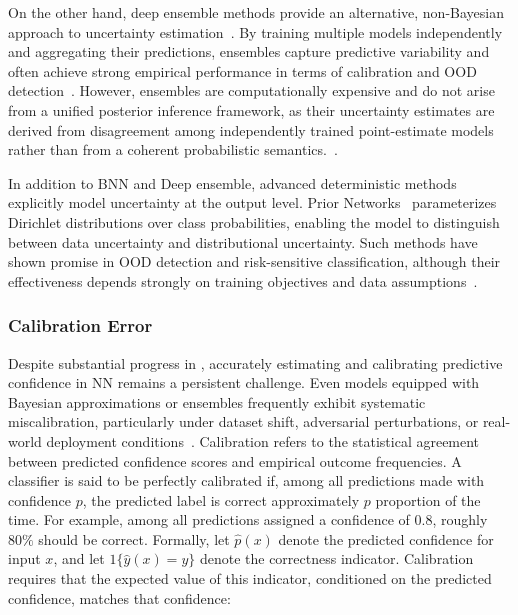 On the other hand, deep ensemble methods provide an alternative, non-Bayesian approach to uncertainty estimation~\cite{lakshminarayanan2017simplescalablepredictiveuncertainty}. 
By training multiple models independently and aggregating their predictions, ensembles capture predictive variability and often achieve strong empirical performance in terms of calibration and \ac{OOD} detection~\cite{ovadia2019trustmodelsuncertaintyevaluating}. However, ensembles are computationally expensive and do not arise from a unified posterior inference framework, as their uncertainty estimates are derived from disagreement among independently trained point-estimate models rather than from a coherent probabilistic semantics.~\cite{Gal2016Uncertainty}.

In addition to \ac{BNN} and Deep ensemble, advanced deterministic methods explicitly model uncertainty at the output level. Prior Networks~\cite{malinin2018predictiveuncertaintyestimationprior} parameterizes Dirichlet distributions over class probabilities, enabling the model to distinguish between data uncertainty and distributional uncertainty. Such methods have shown promise in \ac{OOD} detection and risk-sensitive classification, although their effectiveness depends strongly on training objectives and data assumptions~\cite{Gawlikowski2023}.

\subsubsection{Calibration Error}

Despite substantial progress in , accurately estimating and calibrating predictive confidence in \ac{NN} remains a persistent challenge. Even models equipped with Bayesian approximations or ensembles frequently exhibit systematic miscalibration, particularly under dataset shift, adversarial perturbations, or real-world deployment conditions~\cite{ovadia2019trustmodelsuncertaintyevaluating,begoli2019need,guo2017calibrationmodernneuralnetworks}. Calibration refers to the statistical agreement between predicted confidence scores and empirical outcome frequencies. A classifier is said to be perfectly calibrated if, among all predictions made with confidence $p$, the predicted label is correct approximately $p$ proportion of the time. For example, among all predictions assigned a confidence of $0.8$, roughly $80\%$ should be correct. Formally, let $\hat{p}(x)$ denote the predicted confidence for input $x$, and let $1\{\hat{y}(x)=y\}$ denote the correctness indicator. Calibration requires that the expected value of this indicator, conditioned on the predicted confidence, matches that confidence:

